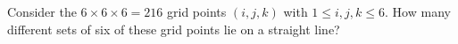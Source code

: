 Consider the $6\times6\times6=216$ grid points $(i,j,k)$ with $1\le i,j,k\le6$. How many different sets of six of these grid points lie on a straight line?
